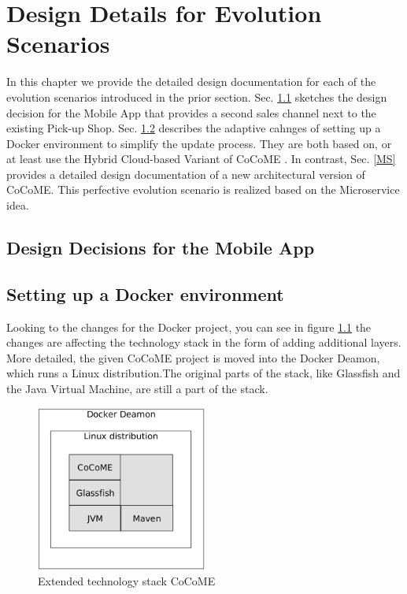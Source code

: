 \chapter{Design Details for Evolution Scenarios}
In this chapter we provide the detailed design documentation for each of the evolution scenarios
introduced in the prior section. Sec. \ref{App} sketches the design decision for the Mobile App that provides a second sales channel next to the existing Pick-up Shop. Sec. \ref{Docker} describes the adaptive cahnges of setting up a Docker environment to simplify the update process. They are both based on, or at least use the Hybrid Cloud-based Variant of CoCoME \cite{SWB-469002735}. In contrast, Sec. \ref{MS} provides a detailed design documentation of a new architectural version of CoCoME. This perfective evolution scenario is realized based on the Microservice idea.

\section{Design Decisions for the Mobile App} \label{App}


\section{Setting up a Docker environment} \label{Docker}
	Looking to the changes for the Docker project, you can see in figure \ref*{techStack} the changes are affecting the technology stack in the form of adding additional layers. More detailed, the given CoCoME project is moved into the Docker Deamon, which runs a Linux distribution.The original parts of the stack, like Glassfish and the Java Virtual Machine, are still a part of the stack.\\
	\begin{figure}[H]
		\centering
		\includegraphics[width = 0.5\textwidth]{img/tech_stack_CoCoME.png}
		\caption{Extended technology stack CoCoME}
		\label{techStack}
	\end{figure}
	
